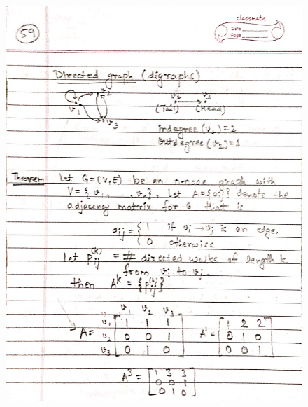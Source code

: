 \begin{figure}[H]
    \centering
    \includegraphics[scale=0.25]{"./MIT-6.042J/MIT-6042J-059"}
\end{figure}
\newpage
